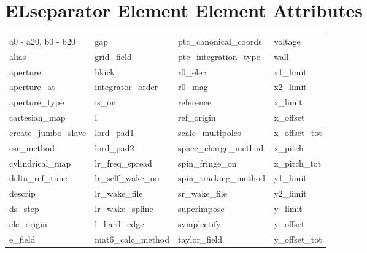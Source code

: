  \section{ELseparator Element Element Attributes}
 \label{s:list.elseparator}
 
 \begin{tabular}{llll} \toprule
a0 - a20, b0 - b20          & gap                         & ptc_canonical_coords        & voltage                     \\
alias                       & grid_field                  & ptc_integration_type        & wall                        \\
aperture                    & hkick                       & r0_elec                     & x1_limit                    \\
aperture_at                 & integrator_order            & r0_mag                      & x2_limit                    \\
aperture_type               & is_on                       & reference                   & x_limit                     \\
cartesian_map               & l                           & ref_origin                  & x_offset                    \\
create_jumbo_slave          & lord_pad1                   & scale_multipoles            & x_offset_tot                \\
csr_method                  & lord_pad2                   & space_charge_method         & x_pitch                     \\
cylindrical_map             & lr_freq_spread              & spin_fringe_on              & x_pitch_tot                 \\
delta_ref_time              & lr_self_wake_on             & spin_tracking_method        & y1_limit                    \\
descrip                     & lr_wake_file                & sr_wake_file                & y2_limit                    \\
ds_step                     & lr_wake_spline              & superimpose                 & y_limit                     \\
ele_origin                  & l_hard_edge                 & symplectify                 & y_offset                    \\
e_field                     & mat6_calc_method            & taylor_field                & y_offset_tot                \\

\end{tabular}
